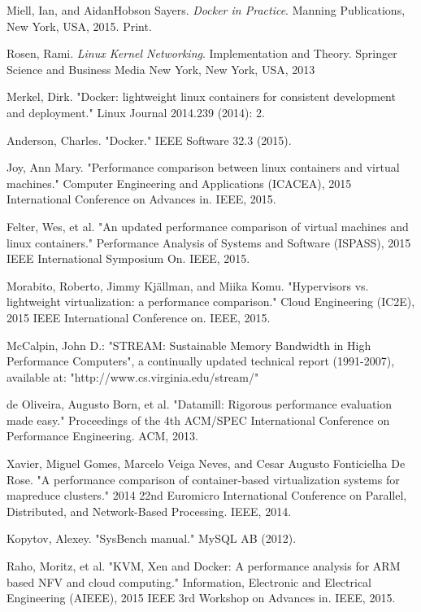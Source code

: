 \documentclass[11pt]{article}
\begin{document}
	\begin{thebibliography}{99}
		Miell, Ian, and AidanHobson Sayers. \textit{Docker in Practice}. Manning Publications, New York, USA, 2015. Print.
		
		Rosen, Rami. \textit{Linux Kernel Networking}. Implementation and Theory. Springer Science and Business Media New York, New York, USA, 2013
		
		Merkel, Dirk. "Docker: lightweight linux containers for consistent development and deployment." Linux Journal 2014.239 (2014): 2.
		
		Anderson, Charles. "Docker." IEEE Software 32.3 (2015).
		
		Joy, Ann Mary. "Performance comparison between linux containers and virtual machines." Computer Engineering and Applications (ICACEA), 2015 International Conference on Advances in. IEEE, 2015.
		
		Felter, Wes, et al. "An updated performance comparison of virtual machines and linux containers." Performance Analysis of Systems and Software (ISPASS), 2015 IEEE International Symposium On. IEEE, 2015.
		
		Morabito, Roberto, Jimmy Kjällman, and Miika Komu. "Hypervisors vs. lightweight virtualization: a performance comparison." Cloud Engineering (IC2E), 2015 IEEE International Conference on. IEEE, 2015.
		
		McCalpin, John D.: "STREAM: Sustainable Memory Bandwidth in
		High Performance Computers", a continually updated technical report
		(1991-2007), available at: "http://www.cs.virginia.edu/stream/"
		
		de Oliveira, Augusto Born, et al. "Datamill: Rigorous performance evaluation made easy." Proceedings of the 4th ACM/SPEC International Conference on Performance Engineering. ACM, 2013.
		
		Xavier, Miguel Gomes, Marcelo Veiga Neves, and Cesar Augusto Fonticielha De Rose. "A performance comparison of container-based virtualization systems for mapreduce clusters." 2014 22nd Euromicro International Conference on Parallel, Distributed, and Network-Based Processing. IEEE, 2014.
		
		Kopytov, Alexey. "SysBench manual." MySQL AB (2012).
		
		Raho, Moritz, et al. "KVM, Xen and Docker: A performance analysis for ARM based NFV and cloud computing." Information, Electronic and Electrical Engineering (AIEEE), 2015 IEEE 3rd Workshop on Advances in. IEEE, 2015.
		

\end{thebibliography}
\end{document}
